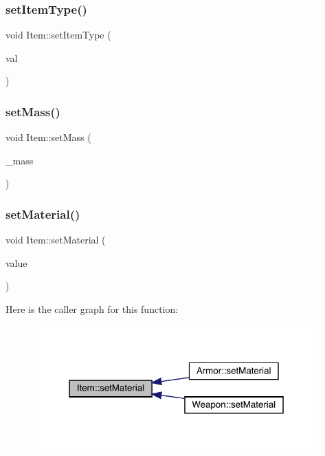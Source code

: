 \subsubsection{\texorpdfstring{set\+Item\+Type()}{setItemType()}}
{\footnotesize\ttfamily void Item\+::set\+Item\+Type (\begin{DoxyParamCaption}\item[{\mbox{\hyperlink{_equipment_8hpp_a3c7fe24829a0b210a1a4d36e29ac01c6}{En\+Item\+Type}}}]{val }\end{DoxyParamCaption})}

\mbox{\label{class_item_a3d6c15b2f0a37709541086df917aa761}} 
\subsubsection{\texorpdfstring{set\+Mass()}{setMass()}}
{\footnotesize\ttfamily void Item\+::set\+Mass (\begin{DoxyParamCaption}\item[{float}]{\+\_\+mass }\end{DoxyParamCaption})}

\mbox{\label{class_item_af8f9e1899f933fc2ae2cdee6c7de0a4e}} 
\subsubsection{\texorpdfstring{set\+Material()}{setMaterial()}}
{\footnotesize\ttfamily void Item\+::set\+Material (\begin{DoxyParamCaption}\item[{\mbox{\hyperlink{class_material}{Material}}}]{value }\end{DoxyParamCaption})}

Here is the caller graph for this function\+:
\nopagebreak
\begin{figure}[H]
\begin{center}
\leavevmode
\includegraphics[width=313pt]{dc/d32/class_item_af8f9e1899f933fc2ae2cdee6c7de0a4e_icgraph}
\end{center}
\end{figure}
\mbox{\label{class_item_a3ae38e2b09f1b12e2fd799865fe7000d}} 
